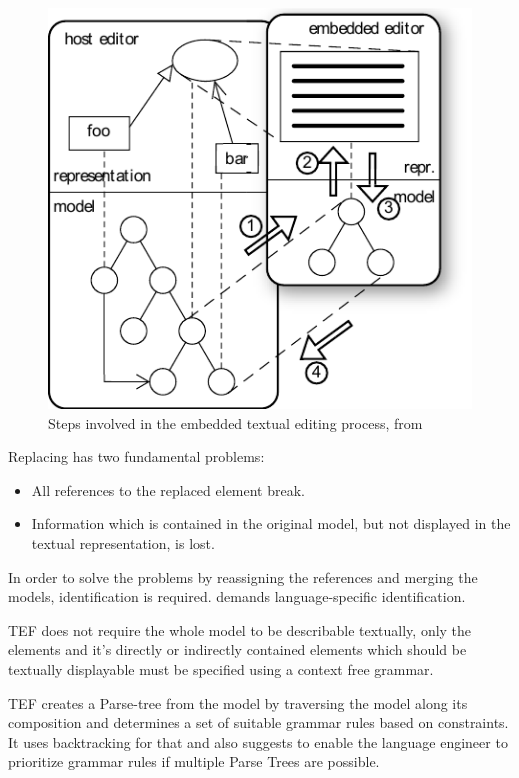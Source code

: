 \begin{figure}
\centering
\includegraphics[scale=1.2]{gfx/ex/tef} 
\caption{Steps involved in the embedded textual editing process, from \cite{TefPaper}}
\label{pic:tef}
\end{figure}

Replacing has two fundamental problems:
\begin{itemize}
	\item All references to the replaced element break.
	\item Information which is contained in the original model, but not displayed in the textual representation, is lost.
\end{itemize}
In order to solve the problems by reassigning the references and merging the models, identification is required. \cite{TefPaper} demands language-specific identification. 

TEF does not require the whole model to be describable textually, only the elements and it's directly or indirectly contained elements which should be textually displayable must be specified using a context free grammar.

TEF creates a Parse-tree from the model by traversing the model along its composition and determines a set of suitable grammar rules based on constraints. It uses backtracking for that and \cite{TefPaper} also suggests to enable the language engineer to prioritize grammar rules if multiple Parse Trees are possible.